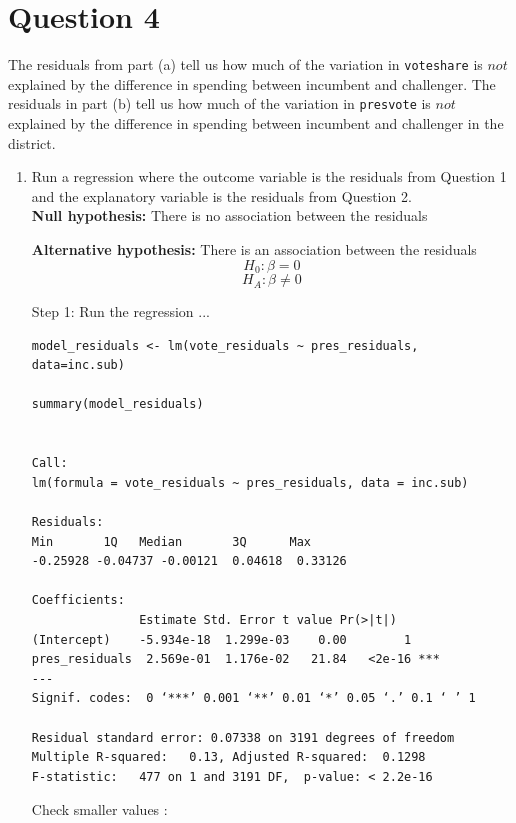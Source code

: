\documentclass[12pt,letterpaper]{article}
\begin{document}
\section*{Question 4}
\noindent The residuals from part (a) tell us how much of the variation in \texttt{voteshare} is $not$ explained by the difference in spending between incumbent and challenger. The residuals in part (b) tell us how much of the variation in \texttt{presvote} is $not$ explained by the difference in spending between incumbent and challenger in the district.
	\begin{enumerate}
		\item Run a regression where the outcome variable is the residuals from Question 1 and the explanatory variable is the residuals from Question 2.	\\
		
\textbf{		Null hypothesis: }
		There is no association between the residuals
		
\textbf{		Alternative hypothesis: }
		There is an association between the residuals \\

	$$H_0: \beta = 0$$
$$H_A: \beta \neq 0$$

\vspace{.25cm}


Step 1: Run the regression ...

			\begin{verbatim}
model_residuals <- lm(vote_residuals ~ pres_residuals, data=inc.sub)

summary(model_residuals)


Call:
lm(formula = vote_residuals ~ pres_residuals, data = inc.sub)

Residuals:
Min       1Q   Median       3Q      Max 
-0.25928 -0.04737 -0.00121  0.04618  0.33126 

Coefficients:
               Estimate Std. Error t value Pr(>|t|)    
(Intercept)    -5.934e-18  1.299e-03    0.00        1    
pres_residuals  2.569e-01  1.176e-02   21.84   <2e-16 ***
---
Signif. codes:  0 ‘***’ 0.001 ‘**’ 0.01 ‘*’ 0.05 ‘.’ 0.1 ‘ ’ 1

Residual standard error: 0.07338 on 3191 degrees of freedom
Multiple R-squared:   0.13,	Adjusted R-squared:  0.1298 
F-statistic:   477 on 1 and 3191 DF,  p-value: < 2.2e-16

		\end{verbatim}

Check smaller values :
			\begin{verbatim}
				

\end{verbatim}
\end{enumerate}
\end{document}
